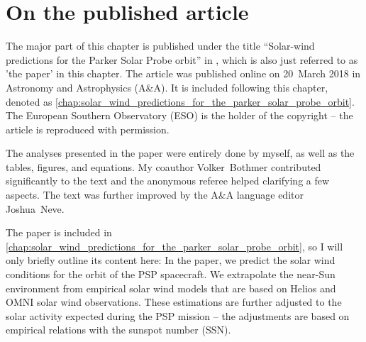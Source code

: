\section{On the published article}
\label{sec:on_the_published_article}
The major part of this chapter is published under the title ``Solar-wind predictions for the Parker Solar Probe orbit'' in \citet{Venzmer2018}, which is also just referred to as 'the paper' in this chapter. The article was published online on 20~March 2018 in Astronomy and Astrophysics (A\&A). It is included following this chapter, denoted as \autoref{chap:solar_wind_predictions_for_the_parker_solar_probe_orbit}. The European Southern Observatory (ESO) is the holder of the copyright -- the article is reproduced with permission.

The analyses presented in the paper were entirely done by myself, as well as the tables, figures, and equations. My coauthor Volker~Bothmer contributed significantly to the text and the anonymous referee helped clarifying a few aspects. The text was further improved by the A\&A language editor Joshua~Neve.

The paper is included in \autoref{chap:solar_wind_predictions_for_the_parker_solar_probe_orbit}, so I will only briefly outline its content here: In the paper, we predict the solar wind conditions for the orbit of the PSP spacecraft. We extrapolate the near-Sun environment from empirical solar wind models that are based on Helios and OMNI solar wind observations. These estimations are further adjusted to the solar activity expected during the PSP mission -- the adjustments are based on empirical relations with the sunspot number (SSN).

